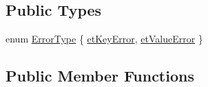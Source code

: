 \subsection*{Public Types}
\begin{DoxyCompactItemize}
\item 
enum \hyperlink{classQCPErrorBars_a95f0220f11a72648b96480a85ce26474}{Error\+Type} \{ \hyperlink{classQCPErrorBars_a95f0220f11a72648b96480a85ce26474a9fca24d20d5376e41be216fc9b08cd21}{et\+Key\+Error}, 
\hyperlink{classQCPErrorBars_a95f0220f11a72648b96480a85ce26474a5f760fc9c0a98c7f1e93e33bf54e9d83}{et\+Value\+Error}
 \}
\end{DoxyCompactItemize}
\subsection*{Public Member Functions}
